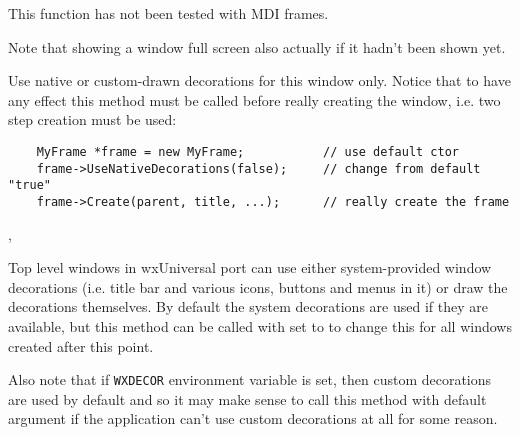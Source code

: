 This function has not been tested with MDI frames.

Note that showing a window full screen also actually
 if it hadn't been shown yet.




\label{wxtoplevelwindowusenativedecorations}



Use native or custom-drawn decorations for this window only. Notice that to
have any effect this method must be called before really creating the window,
i.e. two step creation must be used:
\begin{verbatim}
    MyFrame *frame = new MyFrame;           // use default ctor
    frame->UseNativeDecorations(false);     // change from default "true"
    frame->Create(parent, title, ...);      // really create the frame
\end{verbatim}


,\\


\label{wxtoplevelwindowusenativedecorationsbydefault}



Top level windows in wxUniversal port can use either system-provided window
decorations (i.e. title bar and various icons, buttons and menus in it) or draw
the decorations themselves. By default the system decorations are used if they
are available, but this method can be called with  set to \false to
change this for all windows created after this point.

Also note that if \texttt{WXDECOR} environment variable is set, then custom
decorations are used by default and so it may make sense to call this method
with default argument if the application can't use custom decorations at all
for some reason.



